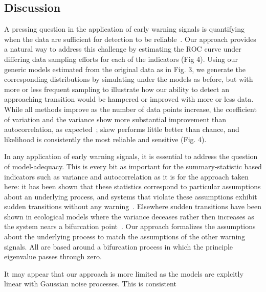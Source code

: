 \documentclass{pnastwo}
\begin{document}
\begin{article}

\section{Discussion}
A pressing question in the application of early warning signals is quantifying
when the data are sufficient for detection to be reliable~\cite{Scheffer2009, Scheffer2010, Inman2011}. 
Our approach provides a natural way to address this challenge by estimating the ROC curve under differing data sampling efforts
for each of the indicators (Fig 4). 
Using our generic models estimated from the original data as in Fig. 3, 
we generate the corresponding distributions by simulating under the models as before, 
but with more or less frequent sampling to illustrate how our ability to detect an approaching transition 
would be hampered or improved with more or less data.  
While all methods improve as the number of data points increase, 
the coefficient of variation and the variance show more substantial improvement than autocorrelation, 
as expected~\cite{Carpenter2011};⁠
skew performs little better than chance, and likelihood is consistently the most reliable and sensitive (Fig. 4). 


In any application of early warning signals, it is essential to address the question of model-adequacy.  
This is every bit as important for the summary-statistic based indicators such as variance and autocorrelation
as it is for the approach taken here: it has been shown that these statistics correspond to particular assumptions about 
an underlying process, and systems that violate these assumptions exhibit sudden transitions without any warning~\cite{Hastings2010}.
Elsewhere sudden transitions have been shown in ecological models where the variance deceases rather then increases as the system nears a bifurcation point~\cite{Schreiber2003, Schreiber2008}.  
Our approach formalizes the assumptions about the underlying process to match the assumptions of the other warning signals.  
All are based around a bifurcation process in which the principle eigenvalue passes through zero. 


It may appear that our approach is more limited as the models are explcitly linear with Gaussian noise processes.
This is consistent


\end{article}
\end{document}
